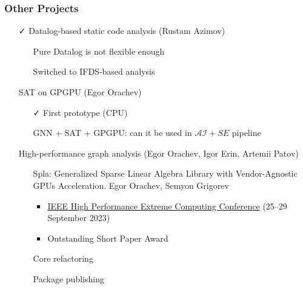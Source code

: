 \documentclass[xcolor=table,aspectratio=169]{beamer}
\begin{document}
\begin{frame}[fragile]
  \frametitle{Other Projects}
  
  \begin{itemize}
    \item[\faCheck] Datalog-based static code analysis (Rustam Azimov)
    \begin{itemize}
      \item[\faFrownO] Pure Datalog is not flexible enough
      \item[\faGears] Switched to IFDS-based analysis
    \end{itemize}
    \item[\faGears] SAT on GPGPU (Egor Orachev)
    \begin{itemize}
      \item[\faCheck] First prototype (CPU)
      \item[\faGears] GNN + SAT + GPGPU: can it be used in $\mathcal{AI}+SE$ pipeline 
    \end{itemize}
    \item[\faGears] High-performance graph analysis (Egor Orachev, Igor Erin, Artemii Patov)
    \begin{itemize}
      \item[\faFileTextO] Spla: Generalized Sparse Linear Algebra Library with Vendor-Agnostic GPUs Acceleration. Egor Orachev, Semyon Grigorev 
      \begin{itemize}        
        \item \href{https://ieee-hpec.org/}{IEEE High Performance Extreme Computing Conference} (25--29 September 2023)
        \item Outstanding Short Paper Award
      \end{itemize}
      \item[\faGears] Core refactoring
      \item[\faGears] Package publishing
    \end{itemize}
  \end{itemize}
\end{frame}
\end{document}
